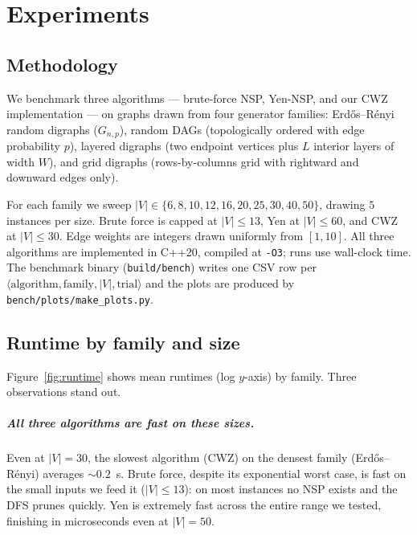 \chapter{Experiments}
\label{ch:experiments}

\section{Methodology}

We benchmark three algorithms --- brute-force NSP, Yen-NSP, and our CWZ
implementation --- on graphs drawn from four generator families:
Erd\H{o}s--R\'enyi random digraphs ($G_{n,p}$), random DAGs (topologically
ordered with edge probability $p$), layered digraphs (two endpoint vertices
plus $L$ interior layers of width $W$), and grid digraphs (rows-by-columns
grid with rightward and downward edges only).

For each family we sweep $|V|\in\{6,8,10,12,16,20,25,30,40,50\}$, drawing
$5$ instances per size. Brute force is capped at $|V|\le 13$, Yen at
$|V|\le 60$, and CWZ at $|V|\le 30$. Edge weights are integers drawn
uniformly from $[1,10]$. All three algorithms are implemented in C++20,
compiled at \texttt{-O3}; runs use wall-clock time. The benchmark binary
(\texttt{build/bench}) writes one CSV row per
$\langle\text{algorithm},\text{family},|V|,\text{trial}\rangle$ and the
plots are produced by \texttt{bench/plots/make\_plots.py}.

\section{Runtime by family and size}

Figure~\ref{fig:runtime} shows mean runtimes (log $y$-axis) by family. Three
observations stand out.

\paragraph{All three algorithms are fast on these sizes.} Even at $|V|=30$,
the slowest algorithm (CWZ) on the densest family (Erd\H{o}s--R\'enyi)
averages $\sim 0.2$~s. Brute force, despite its exponential worst case, is
fast on the small inputs we feed it ($|V|\le 13$): on most instances no NSP
exists and the DFS prunes quickly. Yen is extremely fast across the entire
range we tested, finishing in microseconds even at $|V|=50$.

